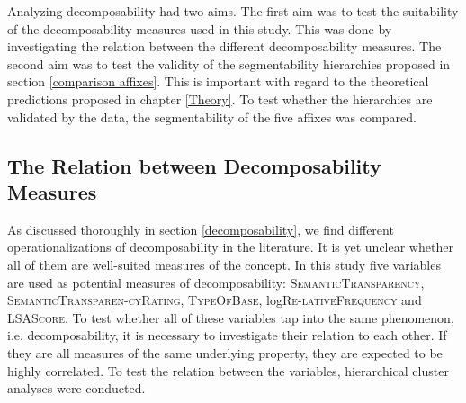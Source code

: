 Analyzing decomposability had two aims. The first aim was to test the suitability of the decomposability measures used in this study. This was done by investigating the relation between the different decomposability measures.  
The second aim was to test the validity of the segmentability hierarchies proposed in section \ref{comparison affixes}.  This is important with regard to the theoretical predictions proposed in chapter \ref{Theory}. To test whether the hierarchies are validated by the data, the segmentability of the five affixes was compared.




\subsection{The Relation between Decomposability Measures} \label{The Relation between Decomposability Measures} 

\vspace*{0.2cm}


As discussed thoroughly in section \ref{decomposability}, we find different operationalizations of decomposability in the literature. It is yet unclear whether all of them are well-suited measures of the concept. In this study five variables are used as potential measures of decomposability: \textsc{SemanticTransparency}, \textsc{SemanticTransparen-cyRating}, \textsc{TypeOfBase}, log\textsc{Re-lativeFrequency} and \textsc{LSAScore}.
To test whether all of these variables tap into the same phenomenon, i.e. decomposability, it is necessary to investigate their relation to each other. If they are all measures of the same underlying property, they are expected to be highly correlated. To test the relation between the variables, hierarchical cluster analyses were conducted. 

